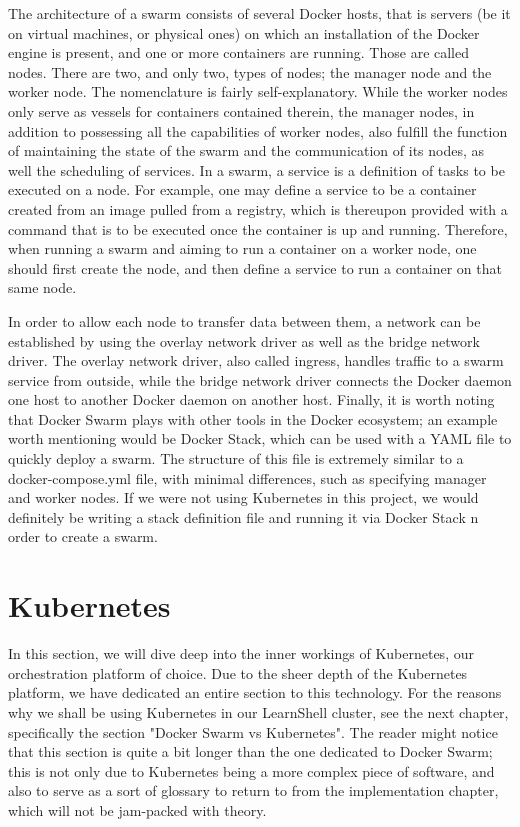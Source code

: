 \documentclass[thesis=B,english]{FITthesis}[2019/12/23]
\begin{document}
The architecture of a swarm consists of several Docker hosts, that is servers (be it on virtual machines, or physical ones) on which an installation of the Docker engine is present, and one or more containers are running. \cite{swarm-key-concepts} Those are called nodes. There are two, and only two, types of nodes; the manager node and the worker node. The nomenclature is fairly self-explanatory. While the worker nodes only serve as vessels for containers contained therein, the manager nodes, in addition to possessing all the capabilities of worker nodes, also fulfill the function of maintaining the state of the swarm and the communication of its nodes, as well the scheduling of services. In a swarm, a service is a definition of tasks to be executed on a node. \cite{swarm-nodes} For example, one may define a service to be a container created from an image pulled from a registry, which is thereupon provided with a command that is to be executed once the container is up and running. Therefore, when running a swarm and aiming to run a container on a worker node, one should first create the node, and then define a service to run a container on that same node.

In order to allow each node to transfer data between them, a network can be established by using the overlay network driver as well as the bridge network driver. The overlay network driver, also called ingress, handles traffic to a swarm service from outside, while the bridge network driver connects the Docker daemon one host to another Docker daemon on another host. 
Finally, it is worth noting that Docker Swarm plays with other tools in the Docker ecosystem; an example worth mentioning would be Docker Stack, which can be used with a YAML file to quickly deploy a swarm. The structure of this file is extremely similar to a docker-compose.yml file, with minimal differences, such as specifying manager and worker nodes. If we were not using Kubernetes in this project, we would definitely be writing a stack definition file and running it via Docker Stack n order to create a swarm. 

\section{Kubernetes}

In this section, we will dive deep into the inner workings of Kubernetes, our orchestration platform of choice. Due to the sheer depth of the Kubernetes platform, we have dedicated an entire section to this technology. For the reasons why we shall be using Kubernetes in our LearnShell cluster, see the next chapter, specifically the section "Docker Swarm vs Kubernetes". The reader might notice that this section is quite a bit longer than the one dedicated to Docker Swarm; this is not only due to Kubernetes being a more complex piece of software, and also to serve as a sort of glossary to return to from the implementation chapter, which will not be jam-packed with theory.
\end{document}
